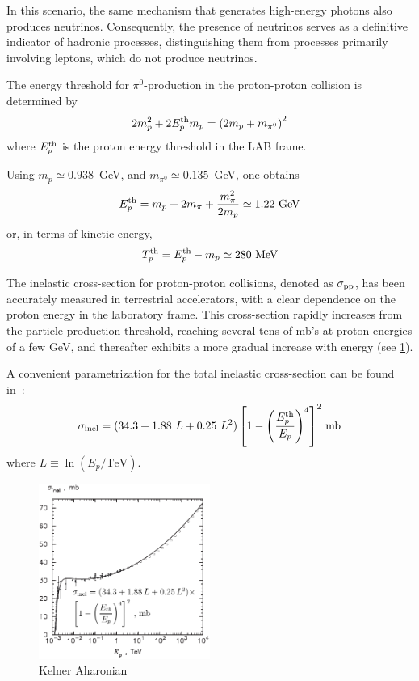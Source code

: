 In this scenario, the same mechanism that generates high-energy photons also produces neutrinos. Consequently, the presence of neutrinos serves as a definitive indicator of hadronic processes, distinguishing them from processes primarily involving leptons, which do not produce neutrinos.

The energy threshold for $\pi^0$-production in the proton-proton collision is determined by
%
\begin{equation}
2 m_p^2 + 2 E^{\rm th}_p m_p = \left(2 m_p + m_{\pi^0} \right)^2
\end{equation}
%
where $E^{\rm th}_p$ is the proton energy threshold in the LAB frame.

Using $m_p \simeq 0.938$~GeV, and $m_{\pi^0} \simeq 0.135$~GeV, one obtains
%
\begin{equation}
E_p^{\rm th} = m_p + 2 m_\pi + \frac{m_\pi^2}{2 m_p} \simeq 1.22~\text{GeV}
\end{equation}
%
or, in terms of kinetic energy,
%
\begin{equation}
T_p^{\rm th} = E_p^{\rm th} - m_p \simeq 280~\text{MeV}
\end{equation}

The inelastic cross-section for proton-proton collisions, denoted as \(\sigma_{\rm pp}\), has been accurately measured in terrestrial accelerators, with a clear dependence on the proton energy in the laboratory frame. This cross-section rapidly increases from the particle production threshold, reaching several tens of mb's at proton energies of a few GeV, and thereafter exhibits a more gradual increase with energy (see \cref{fig:ppin}).

A convenient parametrization for the total inelastic cross-section can be found in~\cite{Kelner2006prd}:
%
\begin{equation}
\sigma_{\rm inel} = (34.3 + 1.88~L + 0.25~L^2) \left[ 1 - \left( \frac{E^{\rm th}_p	}{E_p} \right)^4 \right]^2 \, \text{mb}
\end{equation}
%
where $L \equiv \ln (E_p / \text{TeV} )$.

\begin{figure}[t]
\centering
\includegraphics[width=0.5\textwidth]{figures/KelnerAharonian11.pdf}
\caption{Kelner Aharonian~\cite{Kelner2006prd}}
\label{fig:ppin}
\end{figure}

